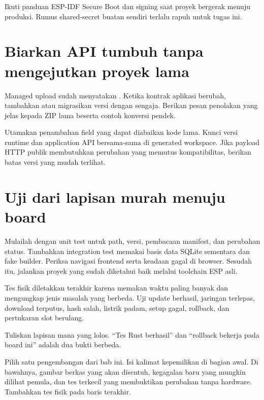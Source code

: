 Ikuti panduan ESP-IDF Secure Boot dan signing saat proyek bergerak menuju produksi. Rumus shared-secret buatan sendiri terlalu rapuh untuk tugas ini.

\section{Biarkan API tumbuh tanpa mengejutkan proyek lama}

Managed upload sudah menyatakan . Ketika kontrak aplikasi berubah, tambahkan atau migrasikan versi dengan sengaja. Berikan pesan penolakan yang jelas kepada ZIP lama beserta contoh konversi pendek.

Utamakan penambahan field yang dapat diabaikan kode lama. Kunci versi runtime dan application API bersama-sama di generated workspace. Jika payload HTTP publik membutuhkan perubahan yang memutus kompatibilitas, berikan batas versi yang mudah terlihat.

\section{Uji dari lapisan murah menuju board}

Mulailah dengan unit test untuk path, versi, pembacaan manifest, dan perubahan status. Tambahkan integration test memakai basis data SQLite sementara dan fake builder. Periksa navigasi frontend serta keadaan gagal di browser. Sesudah itu, jalankan proyek yang sudah diketahui baik melalui toolchain ESP asli.

Tes fisik diletakkan terakhir karena memakan waktu paling banyak dan mengungkap jenis masalah yang berbeda. Uji update berhasil, jaringan terlepas, download terputus, hash salah, listrik padam, setup gagal, rollback, dan pertukaran slot berulang.

Tuliskan lapisan mana yang lolos. ``Tes Rust berhasil'' dan ``rollback bekerja pada board ini'' adalah dua bukti berbeda.

\begin{checkpoint}
Pilih satu pengembangan dari bab ini. Isi kalimat kepemilikan di bagian awal. Di bawahnya, gambar berkas yang akan disentuh, kegagalan baru yang mungkin dilihat pemula, dan tes terkecil yang membuktikan perubahan tanpa hardware. Tambahkan tes fisik pada baris terakhir.
\end{checkpoint}
